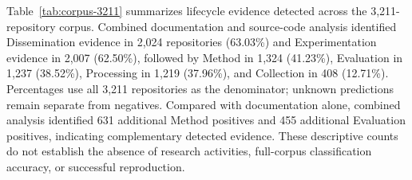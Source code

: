 Table~\ref{tab:corpus-3211} summarizes lifecycle evidence detected across the 3,211-repository corpus. Combined documentation and source-code analysis identified Dissemination evidence in 2,024 repositories (63.03\%) and Experimentation evidence in 2,007 (62.50\%), followed by Method in 1,324 (41.23\%), Evaluation in 1,237 (38.52\%), Processing in 1,219 (37.96\%), and Collection in 408 (12.71\%). Percentages use all 3,211 repositories as the denominator; unknown predictions remain separate from negatives. Compared with documentation alone, combined analysis identified 631 additional Method positives and 455 additional Evaluation positives, indicating complementary detected evidence. These descriptive counts do not establish the absence of research activities, full-corpus classification accuracy, or successful reproduction.
